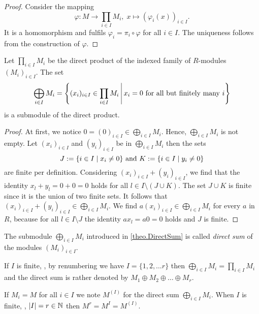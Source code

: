 \begin{proof}
Consider the mapping 
\[\varphi\colon M\to \prod_{i\in I} M_i, \; x \mapsto (\varphi_i(x))_{i\in I}.\]
It is a homomorphism and fulfils $\varphi_i=\pi_i\circ\varphi$ for all $i\in I$. The uniqueness follows from the construction of $\varphi$.
\end{proof}

\begin{thm}\label{theo.DirectSum}
Let $\prod_{i\in I} M_i$ be the direct product of the indexed family of $R$-modules $(M_i)_{i\in I}$. The set
\begin{equation*}
\bigoplus_{i\in I}M_i=\left\lbrace (x_i)_{i\in I}\in \prod_{i\in I} M_i \middle\arrowvert x_i=0 \textnormal{ for all but finitely many } i\right\rbrace
\end{equation*}
is a submodule of the direct product.
\end{thm}

\begin{proof}
At first, we notice $0=(0)_{i\in I}\in \bigoplus_{i\in I}M_i$. Hence, $\bigoplus_{i\in I}M_i$ is not empty. Let $(x_i)_{i\in I}$ and $(y_i)_{i\in I}$ be in $\bigoplus_{i\in I}M_i$ then the sets
\begin{equation*}
J:=\lbrace i\in I\mid x_i\neq 0\rbrace \textnormal{ and } K:=\lbrace i\in I\mid y_i\neq 0\rbrace
\end{equation*} 
are finite per definition. Considering $(x_i)_{i\in I}+(y_i)_{i\in I}$, we find that the identity $x_l+y_l=0+0=0$ holds for all $l\in I\setminus (J\cup K)$. The set $J\cup K$ is finite since it is the union of two finite sets. It follows that $(x_i)_{i\in I}+(y_i)_{i\in I}\in \bigoplus_{i\in I}M_i$. We find $a(x_i)_{i\in I}\in \bigoplus_{i\in I}M_i$ for every $a$ in $R$, because for all $l\in I\setminus J$ the identity $ax_l=a0=0$ holds and $J$ is finite.
\end{proof}

\begin{defin}
\begin{thmlist}
\item\sloppypar The submodule $\bigoplus_{i\in I}M_i$ introduced in \cref{theo.DirectSum} is called \emph{direct sum} of the modules $(M_i)_{i\in I}$.
\item If $I$ is finite,  \ie, by renumbering we have $I=\lbrace 1,2,\ldots r\rbrace$  then $\bigoplus_{i\in I}M_i=\prod_{i\in I} M_i$ and the direct sum is rather denoted by $M_1\oplus M_2\oplus\ldots\oplus M_r$.
\item If $M_i=M$ for all $i\in I$ we note $M^{(I)}$ for the direct sum $\bigoplus_{i\in I}M_i$. When $I$ is finite,  \ie, $|I|=r\in\operatorname{\mathbb{N}}$  then $M^r=M^I=M^{(I)}$.
\end{thmlist}
\end{defin}

